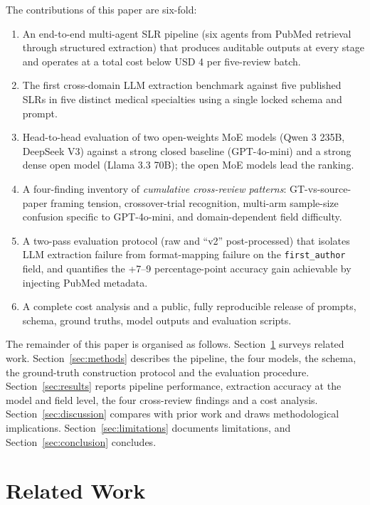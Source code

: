 \documentclass[a4paper,fleqn]{cas-sc}
\begin{document}
The contributions of this paper are six-fold:

\begin{enumerate}
\item An end-to-end multi-agent SLR pipeline (six agents from PubMed retrieval
through structured extraction) that produces auditable outputs at every
stage and operates at a total cost below USD 4 per five-review batch.
\item The first cross-domain LLM extraction benchmark against five published
SLRs in five distinct medical specialties using a single locked schema and
prompt.
\item Head-to-head evaluation of two open-weights MoE models (Qwen 3 235B,
DeepSeek V3) against a strong closed baseline (GPT-4o-mini) and a strong
dense open model (Llama 3.3 70B); the open MoE models lead the ranking.
\item A four-finding inventory of \emph{cumulative cross-review patterns}:
GT-vs-source-paper framing tension, crossover-trial recognition, multi-arm
sample-size confusion specific to GPT-4o-mini, and domain-dependent field
difficulty.
\item A two-pass evaluation protocol (raw and ``v2'' post-processed) that
isolates LLM extraction failure from format-mapping failure on the
\texttt{first\_author} field, and quantifies the +7--9 percentage-point
accuracy gain achievable by injecting PubMed metadata.
\item A complete cost analysis and a public, fully reproducible release of
prompts, schema, ground truths, model outputs and evaluation scripts.
\end{enumerate}

The remainder of this paper is organised as follows. Section~\ref{sec:related}
surveys related work. Section~\ref{sec:methods} describes the pipeline,
the four models, the schema, the ground-truth construction protocol and
the evaluation procedure. Section~\ref{sec:results} reports
pipeline performance, extraction accuracy at the model and field level,
the four cross-review findings and a cost analysis.
Section~\ref{sec:discussion} compares with prior work and draws
methodological implications. Section~\ref{sec:limitations} documents
limitations, and Section~\ref{sec:conclusion} concludes.

\section{Related Work}\label{sec:related}
\end{document}
